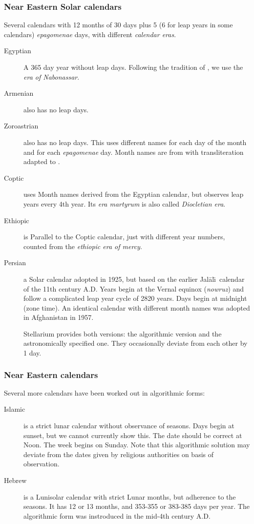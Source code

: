 \subsubsection{Near Eastern Solar calendars}
Several calendars with 12 months of 30 days plus 5 (6 for leap years
in some calendars) \emph{epagomenae} days, with different \emph{calendar eras}.
\begin{description}
\item[Egyptian] A 365 day year without leap days. Following the
  tradition of , we use the \emph{era of Nabonassar}.
\item[Armenian] also has no leap days.
\item[Zoroastrian] also has no leap days. This uses different names
  for each day of the month and for each \emph{epagomenae} day. Month
  names are from \citet[\S69]{Ginzel:ChronologieI} with
  transliteration adapted to \citet{Reingold-Dershowitz:2018}.
\item[Coptic] uses Month names derived from the Egyptian calendar, but observes
  leap years every 4th year. Its \emph{era martyrum} is also called
  \emph{Diocletian era}.
\item[Ethiopic] is Parallel to the Coptic calendar, just with different
  year numbers, counted from the \emph{ethiopic era of mercy}.
\item[Persian] a Solar calendar adopted in 1925,
  but based on the earlier Jal\=al\=\i\ calendar of the 11th century
  A.D. Years begin at the Vernal equinox (\emph{nowruz}) and follow a
  complicated leap year cycle of 2820 years. Days begin at midnight
  (zone time). An identical calendar with different month names was
  adopted in Afghanistan in 1957.

  Stellarium provides both versions: the algorithmic version and the
  astronomically specified one. They occasionally deviate from each
  other by 1 day.
\end{description}

\subsubsection{Near Eastern calendars}
Several more calendars have been worked out in algorithmic forms:
\begin{description}
\item[Islamic] is a strict lunar calendar without observance of
  seasons. Days begin at sunset, but we cannot currently show
  this. The date should be correct at Noon. The week begins on
  Sunday. Note that this algorithmic solution may deviate from the
  dates given by religious authorities on basis of observation.
\item[Hebrew] is a Lunisolar calendar with strict Lunar months, but
  adherence to the seasons. It has 12 or 13 months, and 353-355 or
  383-385 days per year. The algorithmic form was instroduced in the
  mid-4th century A.D.
\end{description}


